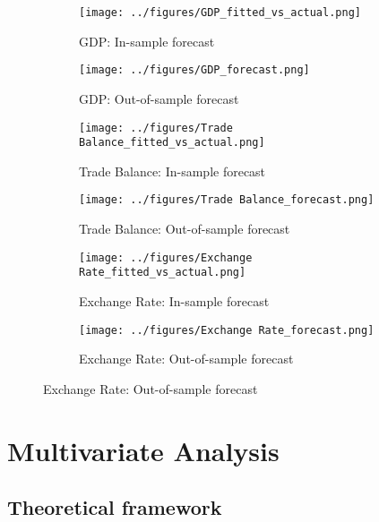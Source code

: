 \documentclass[
]{article}
\begin{document}
\begin{figure}[htbp]
    \centering
        \caption{\textsc{Forecast performance for UK GDP, Exchange Rate, and Trade Balance}}
    \label{fig:forecast_results}
    \begin{subfigure}[b]{0.45\textwidth}
        \texttt{[image: ../figures/GDP\_fitted\_vs\_actual.png]}
        \caption{GDP: In-sample forecast}
        \label{fig:gdp_in}
    \end{subfigure}
    \hfill
    \begin{subfigure}[b]{0.45\textwidth}
        \texttt{[image: ../figures/GDP\_forecast.png]}
        \caption{GDP: Out-of-sample forecast}
        \label{fig:gdp_out}
    \end{subfigure}
    
    \begin{subfigure}[b]{0.45\textwidth}
        \texttt{[image: ../figures/Trade Balance\_fitted\_vs\_actual.png]}
        \caption{Trade Balance: In-sample forecast}
        \label{fig:tb_in}
    \end{subfigure}
    \hfill
    \begin{subfigure}[b]{0.45\textwidth}
        \texttt{[image: ../figures/Trade Balance\_forecast.png]}
        \caption{Trade Balance: Out-of-sample forecast}
        \label{fig:tb_out}
    \end{subfigure}
    
    \begin{subfigure}[b]{0.45\textwidth}
        \texttt{[image: ../figures/Exchange Rate\_fitted\_vs\_actual.png]}
        \caption{Exchange Rate: In-sample forecast}
        \label{fig:er_in}
    \end{subfigure}
    \hfill
    \begin{subfigure}[b]{0.45\textwidth}
        \texttt{[image: ../figures/Exchange Rate\_forecast.png]}
        \caption{Exchange Rate: Out-of-sample forecast}
        \label{fig:er_out}
    \end{subfigure}
\end{figure}

\section{Multivariate Analysis}

\subsection{Theoretical framework}
\end{document}
